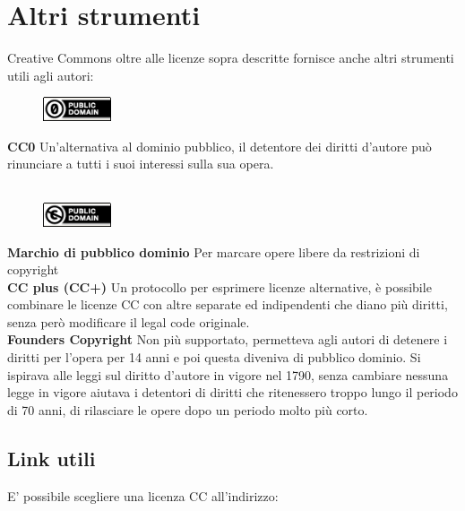 \section{Altri strumenti}

Creative Commons oltre alle licenze sopra descritte fornisce anche altri strumenti utili agli autori:\\

\begin{figure}
    \includegraphics[width=20mm]{images/CC0}
\end{figure}

\noindent \textbf{CC0} Un'alternativa al dominio pubblico, il detentore dei diritti d'autore può rinunciare a tutti i suoi interessi sulla sua opera.\\ \\

\begin{figure}
    \includegraphics[width=20mm]{images/cc_PD}
\end{figure}

\noindent \textbf{Marchio di pubblico dominio} Per marcare opere libere da restrizioni di copyright\\

\textbf{CC plus (CC+)} Un protocollo  per esprimere licenze alternative, è possibile combinare le licenze CC con altre separate ed indipendenti che diano più diritti, senza però modificare il legal code originale.\\

\textbf{Founders Copyright} Non più supportato, permetteva agli autori di detenere i diritti per l'opera per 14 anni e poi questa diveniva di pubblico dominio. Si ispirava alle leggi sul diritto d'autore in vigore nel 1790, senza cambiare nessuna legge in vigore aiutava i detentori di diritti che ritenessero troppo lungo il periodo di 70 anni, di rilasciare le opere dopo un periodo molto più corto.

\subsection{Link utili}

E' possibile scegliere una licenza CC all'indirizzo: \\

